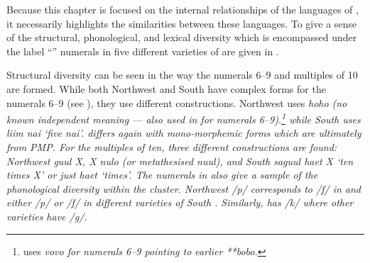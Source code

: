 Because this chapter is focused on the internal relationships
of the languages of ,
it necessarily highlights the similarities between these languages.
To give a sense of the structural,
phonological, and lexical diversity which is encompassed under
the label “” numerals in five different varieties
of  are given in .

Structural diversity can be seen in the way the numerals 6--9
and multiples of 10 are formed.
While both Northwest 
and South  have complex forms for the numerals 6--9 (see
), they use different constructions.
Northwest  uses \it{hoho} (no known independent meaning
--- also used in  for numerals 6--9).\footnote{
		  uses \it{vovo} for numerals 6--9 pointing to earlier **bobo.}
while South  uses \it{liim nai} ‘five \it{nai}’.
  differs again with mono-morphemic forms which
are ultimately from PMP.
For the multiples of ten, three different constructions are found:
Northwest  \it{guul} X,
  X \it{nulo} (or metathesised \it{nuul}),
and South  \it{saguul haet} X ‘ten times X’ or just \it{haet} ‘times’.
The numerals in  also give a sample of the phonological
diversity within the  cluster.
Northwest  /p/ corresponds to /f/ in  
and either /p/ or /f/ in different varieties of South .
Similarly,   has /k/ where other varieties have /g/.

